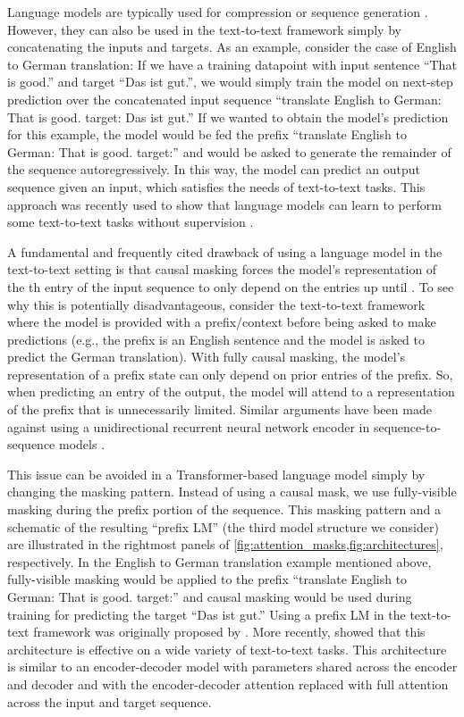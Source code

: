 \documentclass[twoside,11pt]{article}
\begin{document}
Language models are typically used for compression or sequence generation \citep{graves2013generating}.
However, they can also be used in the text-to-text framework simply by concatenating the inputs and targets.
As an example, consider the case of English to German translation: If we have a training datapoint with input sentence ``That is good.'' and target ``Das ist gut.'', we would simply train the model on next-step prediction over the concatenated input sequence ``translate English to German: That is good. target: Das ist gut.''
If we wanted to obtain the model's prediction for this example, the model would be fed the prefix ``translate English to German: That is good. target:'' and would be asked to generate the remainder of the sequence autoregressively.
In this way, the model can predict an output sequence given an input, which satisfies the needs of text-to-text tasks.
This approach was recently used to show that language models can learn to perform some text-to-text tasks without supervision \citep{radford2019language}.

A fundamental and frequently cited drawback of using a language model in the text-to-text setting is that causal masking forces the model's representation of the th entry of the input sequence to only depend on the entries up until .
To see why this is potentially disadvantageous, consider the text-to-text framework where the model is provided with a prefix/context before being asked to make predictions (e.g., the prefix is an English sentence and the model is asked to predict the German translation).
With fully causal masking, the model's representation of a prefix state can only depend on prior entries of the prefix.
So, when predicting an entry of the output, the model will attend to a representation of the prefix that is unnecessarily limited.
Similar arguments have been made against using a unidirectional recurrent neural network encoder in sequence-to-sequence models \citep{bahdanau2014neural}.

This issue can be avoided in a Transformer-based language model simply by changing the masking pattern.
Instead of using a causal mask, we use fully-visible masking during the prefix portion of the sequence.
This masking pattern and a schematic of the resulting ``prefix LM'' (the third model structure we consider) are illustrated in the rightmost panels of \cref{fig:attention_masks,fig:architectures}, respectively.
In the English to German translation example mentioned above, fully-visible masking would be applied to the prefix ``translate English to German: That is good. target:'' and causal masking would be used during training for predicting the target ``Das ist gut.''
Using a prefix LM in the text-to-text framework was originally proposed by \cite{liu2018generating}.
More recently, \cite{dong2019unified} showed that this architecture is effective on a wide variety of text-to-text tasks.
This architecture is similar to an encoder-decoder model with parameters shared across the encoder and decoder and with the encoder-decoder attention replaced with full attention across the input and target sequence.
\end{document}
